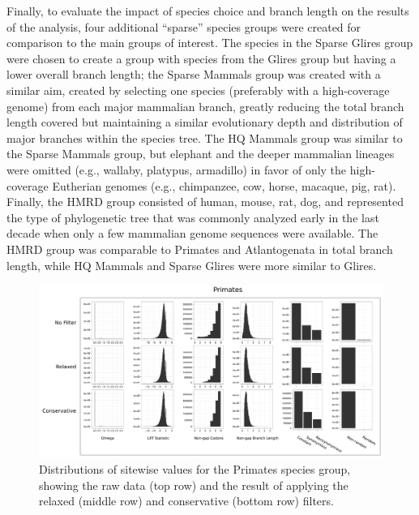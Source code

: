 Finally, to evaluate the impact of species choice and branch length on
the results of the \sw analysis, four additional ``sparse'' species
groups were created for comparison to the main groups of interest. The
species in the Sparse Glires group were chosen to create a group with
species from the Glires group but having a lower overall branch
length; the Sparse Mammals group was created with a similar aim,
created by selecting one species (preferably with a high-coverage
genome) from each major mammalian branch, greatly reducing the total
branch length covered but maintaining a similar evolutionary depth and
distribution of major branches within the species tree. The HQ Mammals
group was similar to the Sparse Mammals group, but elephant and the
deeper mammalian lineages were omitted (e.g., wallaby, platypus,
armadillo) in favor of only the high-coverage Eutherian genomes (e.g.,
chimpanzee, cow, horse, macaque, pig, rat). Finally, the HMRD group
consisted of human, mouse, rat, dog, and represented the type of
phylogenetic tree that was commonly analyzed early in the last decade
when only a few mammalian genome sequences were available. The HMRD
group was comparable to Primates and Atlantogenata in total branch
length, while HQ Mammals and Sparse Glires were more similar to
Glires.


\begin{landscape}
\begin{figure}
\centering
\includegraphics[scale=0.42]{Figs/qc_hist_primates.pdf}
\caption{Distributions of sitewise values for the Primates species
  group, showing the raw data (top row) and the result of applying the
  relaxed (middle row) and conservative (bottom row) filters.}
\label{fig_qc_hist_primates}
\end{figure}
\end{landscape}

